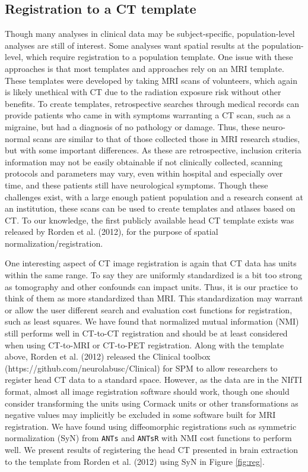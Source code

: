 \documentclass[]{elsarticle} %
\begin{document}
\hypertarget{registration-to-a-ct-template}{%
\subsection{Registration to a CT template}\label{registration-to-a-ct-template}}

Though many analyses in clinical data may be subject-specific, population-level analyses are still of interest. Some analyses want spatial results at the population-level, which require registration to a population template. One issue with these approaches is that most templates and approaches rely on an MRI template. These templates were developed by taking MRI scans of volunteers, which again is likely unethical with CT due to the radiation exposure risk without other benefits. To create templates, retrospective searches through medical records can provide patients who came in with symptoms warranting a CT scan, such as a migraine, but had a diagnosis of no pathology or damage. Thus, these neuro-normal scans are similar to that of those collected those in MRI research studies, but with some important differences. As these are retrospective, inclusion criteria information may not be easily obtainable if not clinically collected, scanning protocols and parameters may vary, even within hospital and especially over time, and these patients still have neurological symptoms. Though these challenges exist, with a large enough patient population and a research consent at an institution, these scans can be used to create templates and atlases based on CT. To our knowledge, the first publicly available head CT template exists was released by Rorden et al. (2012), for the purpose of spatial normalization/registration.

One interesting aspect of CT image registration is again that CT data has units within the same range. To say they are uniformly standardized is a bit too strong as tomography and other confounds can impact units. Thus, it is our practice to think of them as more standardized than MRI. This standardization may warrant or allow the user different search and evaluation cost functions for registration, such as least squares. We have found that normalized mutual information (NMI) still performs well in CT-to-CT registration and should be at least considered when using CT-to-MRI or CT-to-PET registration. Along with the template above, Rorden et al. (2012) released the Clinical toolbox (https://github.com/neurolabusc/Clinical) for SPM to allow researchers to register head CT data to a standard space. However, as the data are in the NIfTI format, almost all image registration software should work, though one should consider transforming the units using Cormack units or other transformations as negative values may implicitly be excluded in some software built for MRI registration. We have found using diffeomorphic registrations such as symmetric normalization (SyN) from \texttt{ANTs} and \texttt{ANTsR} with NMI cost functions to perform well. We present results of registering the head CT presented in brain extraction to the template from Rorden et al. (2012) using SyN in Figure \ref{fig:reg}.
\end{document}
